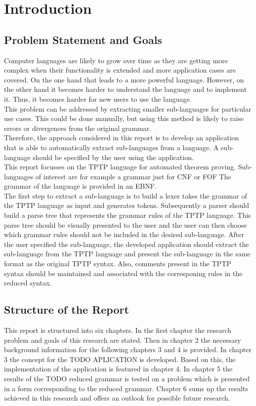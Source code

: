 
\chapter{Introduction}\label{cha:Introduction}

\section{Problem Statement and Goals}\label{sec:Aufgabenstellung}
Computer languages are likely to grow over time as they are getting more complex when their functionality is extended and more application cases are covered.
On the one hand that leads to a more powerful language.
However, on the other hand it becomes harder to understand the language and to implement it.
Thus, it becomes harder for new users to use the language.\\
This problem can be addressed by extracting smaller sub-languages for particular use cases. 
This could be done manually, but using this method is likely to raise errors or divergences from the original grammar.\\
Therefore, the approach considered in this report is to develop an application that is able to automatically extract sub-languages from a language.
A sub-language should be specified by the user using the application.\\
This report focusses on the \acf{TPTP} language for automated theorem proving.
Sub-languages of interest are for example a grammar just for \ac{CNF} or \ac{FOF}
The grammar of the language is provided in an \acf{EBNF}.\\
The first step to extract a sub-language is to build a lexer takes the grammar of the TPTP language as input and generates tokens.
Subsequently a parser should build a parse tree that represents the grammar rules of the \ac{TPTP} language.
This parse tree should be visually presented to the user and the user can then choose which grammar rules should not be included in the desired sub-language.
After the user specified the sub-language, the developed application should extract the sub-language from the \ac{TPTP} language and present the sub-language in the same format as the original \ac{TPTP} syntax.
Also, comments present in the \ac{TPTP} syntax should be maintained and associated with the corresponing rules in the reduced syntax.
\section{Structure of the Report}\label{sec:IntroductionStructure}
This report is structured into six chapters. In the first chapter the research problem and goals of this research are stated.
Then in chapter 2 the necessary background information for the following chapters 3 and 4 is provided.
In chapter 3 the concept for the TODO APLICATION is developed.
Based on this, the implementation of the application is featured in chapter 4.
In chapter 5 the results of the TODO reduced grammar is tested on a problem which is presented in a form corresponding to the reduced grammar.
Chapter 6 sums up the results achieved in this research and offers an outlook for possible future research.